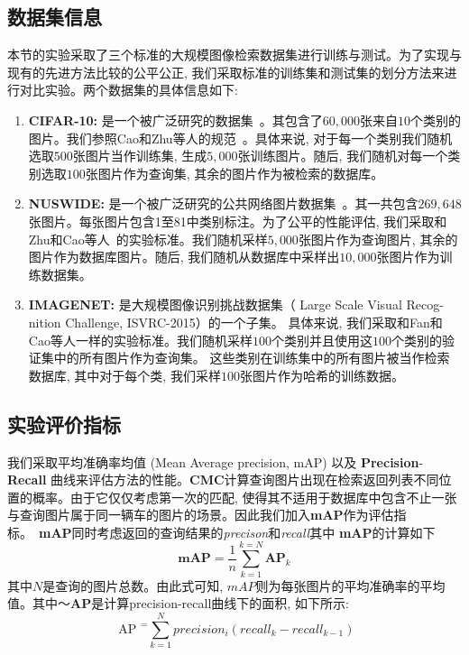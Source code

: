   \subsection{数据集信息}
  本节的实验采取了三个标准的大规模图像检索数据集进行训练与测试。为了实现与现有的先进方法比较的公平公正, 我们采取标准的训练集和测试集的划分方法来进行对比实验。两个数据集的具体信息如下:
  \begin{enumerate}
    \item \textbf{CIFAR-10:} 是一个被广泛研究的数据集~\cite{krizhevsky2009learning}。其包含了$60,000$张来自$10$个类别的图片。我们参照Cao和Zhu等人的规范~\cite{cao2018deep,zhu2016deep}。具体来说, 对于每一个类别我们随机选取$500$张图片当作训练集, 生成$5,000$张训练图片。随后, 我们随机对每一个类别选取$100$张图片作为查询集, 其余的图片作为被检索的数据库。
    \item \textbf{NUSWIDE:} 是一个被广泛研究的公共网络图片数据集~\cite{chua2009nus}。其一共包含$269,648$张图片。每张图片包含1至81中类别标注。为了公平的性能评估, 我们采取和Zhu和Cao等人~\cite{cao2017hashnet,zhu2016deep}的实验标准。我们随机采样$5,000$张图片作为查询图片, 其余的图片作为数据库图片。随后, 我们随机从数据库中采样出$10,000$张图片作为训练数据集。
    \item \textbf{IMAGENET:} 是大规模图像识别挑战数据集（ Large Scale Visual Recog-
    nition Challenge, ISVRC-2015）的一个子集。 具体来说, 我们采取和Fan和Cao等人\cite{fan20deep, cao2017hashnet}一样的实验标准。我们随机采样$100$个类别并且使用这$100$个类别的验证集中的所有图片作为查询集。 这些类别在训练集中的所有图片被当作检索数据库, 其中对于每个类, 我们采样$100$张图片作为哈希的训练数据。
  \end{enumerate}

  \subsection{实验评价指标}
  我们采取平均准确率均值 (Mean Average precision, mAP) 以及 \textbf{Precision}-\textbf{Recall}   曲线来评估方法的性能。\textbf{CMC}计算查询图片出现在检索返回列表不同位置的概率。由于它仅仅考虑第一次的匹配, 使得其不适用于数据库中包含不止一张与查询图片属于同一辆车的图片的场景。因此我们加入\textbf{mAP}作为评估指标。~\textbf{mAP}同时考虑返回的查询结果的\textit{precison}和\textit{recall}其中 \textbf{mAP}的计算如下
  \begin{equation}
     \textbf{mAP} = \frac{1}{n} \sum_{k=1}^{k= N} \textbf{AP}_k
  \end{equation}
  其中$N$是查询的图片总数。由此式可知, $mAP$则为每张图片的平均准确率的平均值。其中～\textbf{AP}是计算precision-recall曲线下的面积, 如下所示:
  \begin{equation}
    \text { AP }^{=} \sum_{k=1}^{N} precision _{i}\left( recall _{k}- recall _{k-1}\right)
\end{equation}

